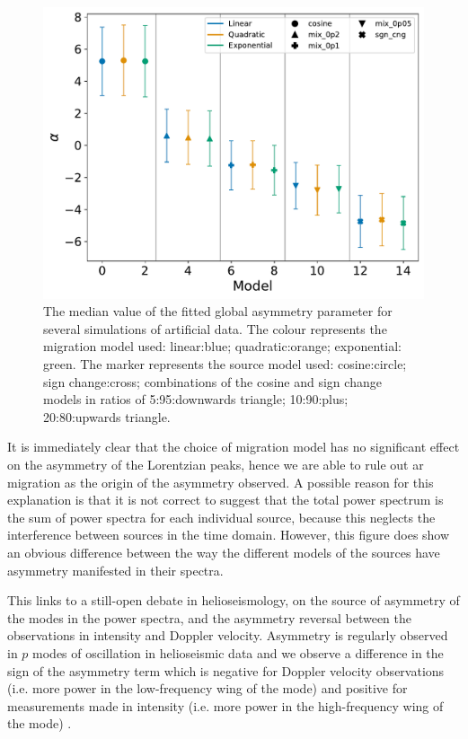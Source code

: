 \begin{figure}[ht!]
	\centering
	\includegraphics[width=0.85\columnwidth]{artificial_fit_asym.pdf}
	\caption{The median value of the fitted global asymmetry parameter for several simulations of artificial data. The colour represents the migration model used: linear:blue; quadratic:orange; exponential: green. The marker represents the source model used: cosine:circle; sign change:cross; combinations of the cosine and sign change models in ratios of 5:95:downwards triangle; 10:90:plus; 20:80:upwards triangle.}
	\label{fig:artificial_asymm}
\end{figure}

It is immediately clear that the choice of migration model has no significant effect on the asymmetry of the Lorentzian peaks, hence we are able to rule out \gls{ar} migration as the origin of the asymmetry observed. A possible reason for this explanation is that it is not correct to suggest that the total power spectrum is the sum of power spectra for each individual source, because this neglects the interference between sources in the time domain. However, this figure does show an obvious difference between the way the different models of the sources have asymmetry manifested in their spectra.

This links to a still-open debate in helioseismology, on the source of asymmetry of the modes in the power spectra, and the asymmetry reversal between the observations in intensity and Doppler velocity. Asymmetry is regularly observed in $p$ modes of oscillation in helioseismic data and we observe a difference in the sign of the asymmetry term which is negative for Doppler velocity observations (i.e. more power in the low-frequency wing of the mode) and positive for measurements made in intensity (i.e. more power in the high-frequency wing of the mode) \citep{duvall_asymmetries_1993, chaplin_depth_1999, howe_validation_2015, basu_asteroseismic_2017}.


